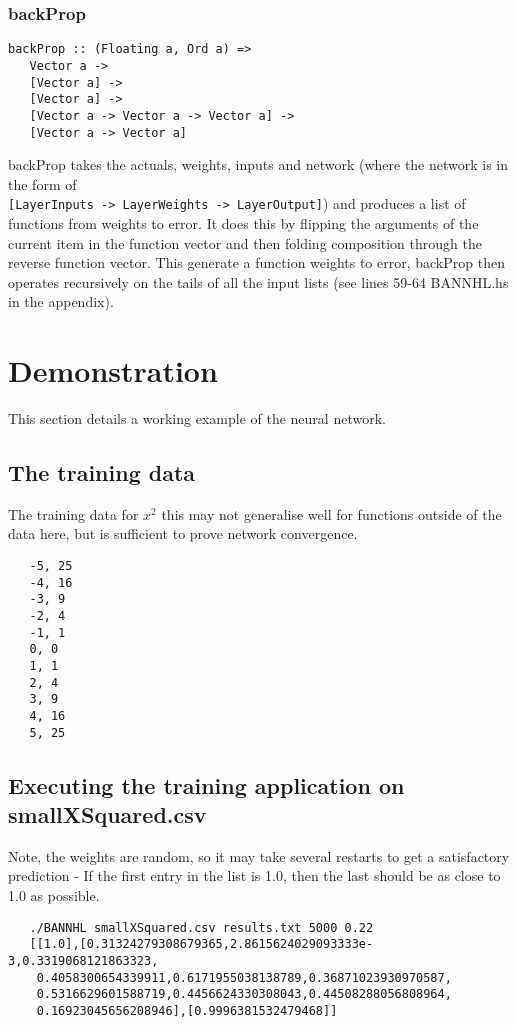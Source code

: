 \documentclass[a4paper]{article}
\newenvironment{code}{\captionsetup{type=listing}}{}
\begin{document}
\subsubsection{backProp}
\begin{verbatim}
backProp :: (Floating a, Ord a) =>
   Vector a ->
   [Vector a] ->
   [Vector a] ->
   [Vector a -> Vector a -> Vector a] ->
   [Vector a -> Vector a]
\end{verbatim}
backProp takes the actuals, weights, inputs and network (where the network is
in the form of \\
\texttt{[LayerInputs -> LayerWeights ->
LayerOutput]}) and produces a list of functions from weights to error.
It does this by flipping the arguments of the current item in the function
vector and then folding composition through the reverse function vector.
This generate a function weights to error, backProp then operates recursively
on the tails of all the input lists (see lines 59-64 BANNHL.hs in the
appendix).

\section{Demonstration}
This section details a working example of the neural network.
\subsection{The training data}
The training data for $x^2$ this may not generalise well for functions outside
of the data here, but is sufficient to prove network convergence.
\begin{code}
   \begin{verbatim}
   -5, 25
   -4, 16
   -3, 9
   -2, 4
   -1, 1
   0, 0
   1, 1
   2, 4
   3, 9
   4, 16
   5, 25
   \end{verbatim}
\end{code}

\subsection{Executing the training application on smallXSquared.csv}
Note, the weights are random, so it may take several restarts to get
a satisfactory prediction - If the first entry in the list is 1.0, then
the last should be as close to 1.0 as possible.
\begin{code}
   \begin{verbatim}
   ./BANNHL smallXSquared.csv results.txt 5000 0.22
   [[1.0],[0.31324279308679365,2.8615624029093333e-3,0.3319068121863323,
    0.4058300654339911,0.6171955038138789,0.36871023930970587,
    0.5316629601588719,0.4456624330308043,0.44508288056808964,
    0.16923045656208946],[0.9996381532479468]]
   \end{verbatim}
\end{code}
\end{document}
